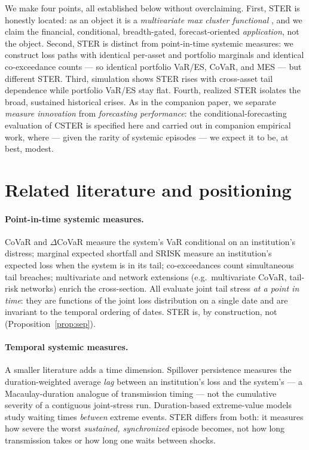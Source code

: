 \documentclass[11pt]{article}
\begin{document}
We make four points, all established below without overclaiming. First, STER is honestly located: as an
object it is a \emph{multivariate max cluster functional} \citep{basraksegers2009}, and we claim the
financial, conditional, breadth-gated, forecast-oriented \emph{application}, not the object. Second, STER is
distinct from point-in-time systemic measures: we construct loss paths with identical per-asset and portfolio
marginals and identical co-exceedance counts --- so identical portfolio VaR/ES, CoVaR, and MES --- but
different STER. Third, simulation shows STER rises with cross-asset tail dependence while portfolio VaR/ES
stay flat. Fourth, realized STER isolates the broad, sustained historical crises. As in the companion paper,
we separate \emph{measure innovation} from \emph{forecasting performance}: the conditional-forecasting
evaluation of CSTER is specified here and carried out in companion empirical work, where --- given the
rarity of systemic episodes --- we expect it to be, at best, modest.

\section{Related literature and positioning}
\paragraph{Point-in-time systemic measures.} CoVaR and $\Delta$CoVaR \citep{adrianbrunnermeier2016} measure
the system's VaR conditional on an institution's distress; marginal expected shortfall and SRISK
\citep{acharya2017,brownleesengle2017} measure an institution's expected loss when the system is in its
tail; co-exceedances \citep{baekarolyistulz2003} count simultaneous tail breaches; multivariate and network
extensions (e.g.\ multivariate CoVaR, tail-risk networks) enrich the cross-section. All evaluate joint tail
stress \emph{at a point in time}: they are functions of the joint loss distribution on a single date and are
invariant to the temporal ordering of dates. STER is, by construction, not (Proposition~\ref{prop:sep}).

\paragraph{Temporal systemic measures.} A smaller literature adds a time dimension. Spillover persistence
\citep{cosp} measures the duration-weighted average \emph{lag} between an institution's loss and the
system's --- a Macaulay-duration analogue of transmission timing --- not the cumulative severity of a
contiguous joint-stress run. Duration-based extreme-value models study waiting times \emph{between} extreme
events. STER differs from both: it measures how severe the worst \emph{sustained, synchronized} episode
becomes, not how long transmission takes or how long one waits between shocks.
\end{document}

